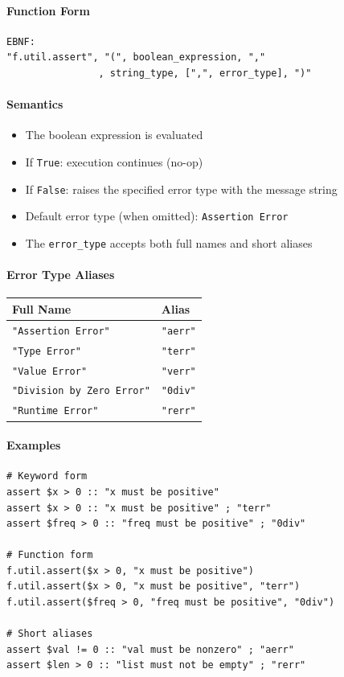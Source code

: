 \paragraph{Function Form}
\begin{verbatim}
EBNF:
"f.util.assert", "(", boolean_expression, ","
                , string_type, [",", error_type], ")"
\end{verbatim}

\paragraph{Semantics}
\begin{itemize}
\item The boolean expression is evaluated
\item If \texttt{True}: execution continues (no-op)
\item If \texttt{False}: raises the specified error type with the message string
\item Default error type (when omitted): \texttt{Assertion Error}
\item The \texttt{error\_type} accepts both full names and short aliases
\end{itemize}

\paragraph{Error Type Aliases}
\begin{center}
\begin{tabular}{ll}
Full Name & Alias \\ \hline
\texttt{"Assertion Error"} & \texttt{"aerr"} \\
\texttt{"Type Error"} & \texttt{"terr"} \\
\texttt{"Value Error"} & \texttt{"verr"} \\
\texttt{"Division by Zero Error"} & \texttt{"0div"} \\
\texttt{"Runtime Error"} & \texttt{"rerr"} \\
\end{tabular}
\end{center}

\paragraph{Examples}
\begin{verbatim}
# Keyword form
assert $x > 0 :: "x must be positive"
assert $x > 0 :: "x must be positive" ; "terr"
assert $freq > 0 :: "freq must be positive" ; "0div"

# Function form
f.util.assert($x > 0, "x must be positive")
f.util.assert($x > 0, "x must be positive", "terr")
f.util.assert($freq > 0, "freq must be positive", "0div")

# Short aliases
assert $val != 0 :: "val must be nonzero" ; "aerr"
assert $len > 0 :: "list must not be empty" ; "rerr"
\end{verbatim}

